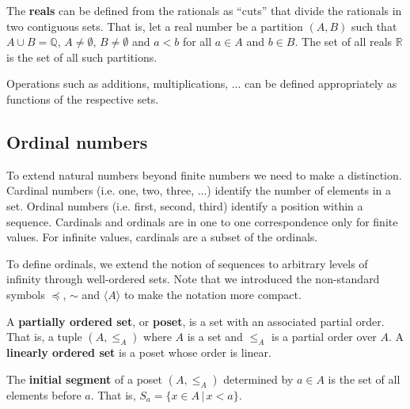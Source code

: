 \documentclass{bareminimum}
\def\ordleq{\preceq}
\def\ordeq{\sim}
\begin{document}
\begin{defn}
	The \textbf{reals} can be defined from the rationals as ``cuts'' that divide the rationals in two contiguous sets. That is, let a real number be a partition $(A, B)$ such that $A \cup B = \mathbb{Q}$, $A \neq \emptyset$, $B \neq \emptyset$ and $a < b$ for all $a \in A$ and $b \in B$. The set of all reals $\mathbb{R}$ is the set of all such partitions.
\end{defn}

\begin{remark}
	Operations such as additions, multiplications, ... can be defined appropriately as functions of the respective sets.
\end{remark}

\subsection{Ordinal numbers}

To extend natural numbers beyond finite numbers we need to make a distinction. Cardinal numbers (i.e. one, two, three, ...) identify the number of elements in a set. Ordinal numbers (i.e. first, second, third) identify a position within a sequence. Cardinals and ordinals are in one to one correspondence only for finite values. For infinite values, cardinals are a subset of the ordinals.

\begin{remark}
	To define ordinals, we extend the notion of sequences to arbitrary levels of infinity through well-ordered sets. Note that we introduced the non-standard symbols $\ordleq$, $\ordeq$ and $\langle A \rangle$ to make the notation more compact.
\end{remark}

\begin{defn}[Poset]
	A \textbf{partially ordered set},  or \textbf{poset}, is a set with an associated partial order. That is, a tuple $(A, \leq_A)$ where $A$ is a set and $\leq_A$ is a partial order over $A$. A \textbf{linearly ordered set} is a poset whose order is linear.
\end{defn}

\begin{defn}
	The \textbf{initial segment}  of a poset $(A, \leq_A)$ determined by $a \in A$ is the set of all elements before $a$. That is, $S_a=\{ x \in A \, | \, x < a \}$.
\end{defn}
\end{document}
